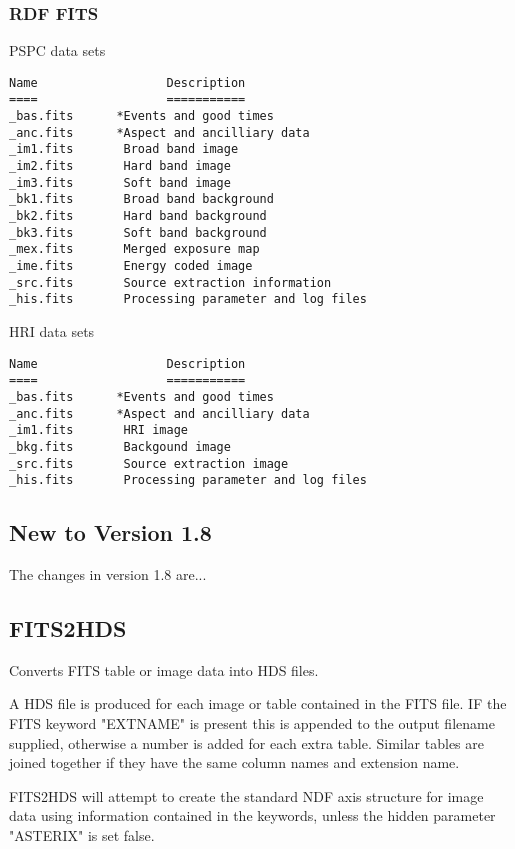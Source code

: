 \documentclass{book}
\renewcommand{\_}{{\tt\char'137}}     %
\begin{document}
\subsubsection{RDF FITS}
PSPC data sets
\begin{verbatim}
Name                  Description
====                  ===========
_bas.fits      *Events and good times
_anc.fits      *Aspect and ancilliary data
_im1.fits       Broad band image
_im2.fits       Hard band image
_im3.fits       Soft band image
_bk1.fits       Broad band background
_bk2.fits       Hard band background
_bk3.fits       Soft band background
_mex.fits       Merged exposure map
_ime.fits       Energy coded image
_src.fits       Source extraction information
_his.fits       Processing parameter and log files
\end{verbatim}
HRI data sets
\begin{verbatim}
Name                  Description
====                  ===========
_bas.fits      *Events and good times
_anc.fits      *Aspect and ancilliary data
_im1.fits       HRI image
_bkg.fits       Backgound image
_src.fits       Source extraction image
_his.fits       Processing parameter and log files
\end{verbatim}
\subsection{New to Version 1.8}
The changes in version 1.8 are...
\subsection{FITS2HDS}
Converts FITS table or image data into HDS files.

A HDS file is produced for each image or table contained in the
FITS file. IF the FITS keyword "EXTNAME" is present this is
appended to the output filename supplied, otherwise a number is
added for each extra table. Similar tables are joined together
if they have the same column names and extension name.

FITS2HDS will attempt to create the standard NDF axis structure
for image data using information contained in the keywords, unless
the hidden parameter "ASTERIX" is set false.
\end{document}
